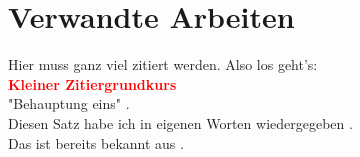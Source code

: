 \chapter{Verwandte Arbeiten}
\label{ch:relatedwork} %

\par
Hier muss ganz viel zitiert werden. Also los geht's:\\
\textbf{\textcolor{red}{Kleiner Zitiergrundkurs}}\\

"Behauptung eins" \cite[Abs. 3]{Manning2009} .\\
Diesen Satz habe ich in eigenen Worten wiedergegeben \cite{Breiman2001}.\\
Das ist bereits bekannt aus \cite[S.155-161]{Schultz1968}.




